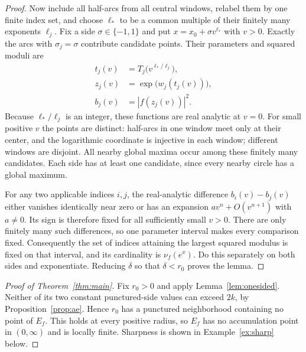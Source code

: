 \documentclass[11pt,reqno]{amsart}
\theoremstyle{remark}
\numberwithin{equation}{section}
\begin{document}
\begin{proof}
Now include all half-arcs from all central windows, relabel them by
one finite index set, and choose $\ell_*$ to be a common multiple of
their finitely many exponents
$\ell_j$. Fix a side $\sigma\in\{-1,1\}$ and put
$x=x_0+\sigma v^{\ell_*}$ with $v>0$. Exactly the arcs with
$\sigma_j=\sigma$ contribute candidate points. Their parameters
and squared moduli are
\begin{equation}\label{eq:commonparameter}
 \begin{split}
 t_j(v)&=T_j\bigl(v^{\ell_*/\ell_j}\bigr),\\
 z_j(v)&=\exp\bigl(w_j(t_j(v))\bigr),\\
 b_j(v)&=|f(z_j(v))|^2.
 \end{split}
\end{equation}
Because $\ell_*/\ell_j$ is an integer, these functions are real
analytic at $v=0$. For small positive $v$ the points are
distinct: half-arcs in one window meet only at their center,
and the logarithmic coordinate is injective in each window;
different windows are disjoint. All nearby global maxima occur
among these finitely many candidates. Each side has at least one
candidate, since every nearby circle has a global maximum.

For any two applicable indices $i,j$, the real-analytic
difference $b_i(v)-b_j(v)$ either vanishes identically near zero
or has an expansion $a v^n+O(v^{n+1})$ with $a\ne0$.
Its sign is therefore fixed for all sufficiently small $v>0$.
There are only finitely many such differences, so one parameter
interval makes every comparison fixed. Consequently the set
of indices attaining the largest squared modulus is fixed
on that interval, and its cardinality is $\nu_f(e^x)$.
Do this separately on both sides and exponentiate. Reducing
$\delta$ so that $\delta<r_0$ proves the lemma.
\end{proof}

\begin{proof}[Proof of Theorem~\ref{thm:main}]
Fix $r_0>0$ and apply Lemma~\ref{lem:onesided}. Neither of its two
constant punctured-side values can exceed $2k$, by
Proposition~\ref{prop:ae}. Hence $r_0$ has a punctured neighborhood
containing no point of $E_f$. This holds at every positive radius,
so $E_f$ has no accumulation point in $(0,\infty)$ and is locally
finite. Sharpness is shown in Example~\ref{ex:sharp} below.
\end{proof}
\end{document}
